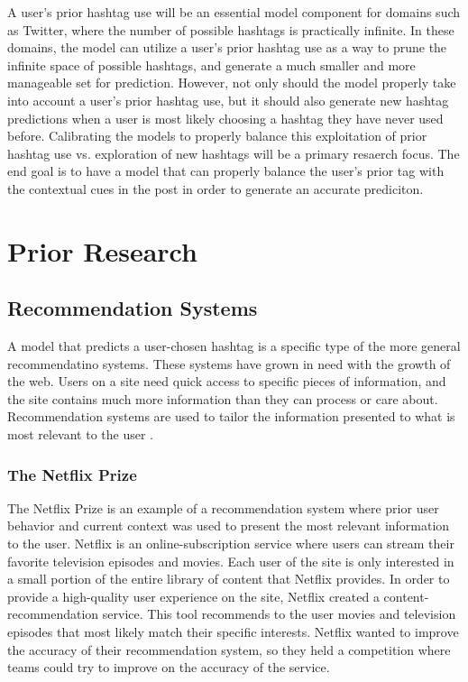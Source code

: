 \documentclass[man,floatsintext]{apa6}
\begin{document}
A user's prior hashtag use will be an essential model component for domains such as Twitter, where the number of possible hashtags is practically infinite.
In these domains, the model can utilize a user's prior hashtag use as a way to prune the infinite space of possible hashtags, and generate a much smaller and more manageable set for prediction.
However, not only should the model properly take into account a user's prior hashtag use, but it should also generate new hashtag predictions when a user is most likely choosing a hashtag they have never used before.
Calibrating the models to properly balance this exploitation of prior hashtag use vs. exploration of new hashtags will be a primary resaerch focus.
The end goal is to have a model that can properly balance the user's prior tag with the contextual cues in the post in order to generate an accurate prediciton.

\section{Prior Research}

\subsection{Recommendation Systems}

A model that predicts a user-chosen hashtag is a specific type of the more general recommendatino systems.
These systems have grown in need with the growth of the web.
Users on a site need quick access to specific pieces of information, and the site contains much more information than they can process or care about.
Recommendation systems are used to tailor the information presented to what is most relevant to the user \parencite{Pazzani2007}.

\subsubsection{The Netflix Prize}

The Netflix Prize \parencite{Bennett2007} is an example of a recommendation system where prior user behavior and current context was used to present the most relevant information to the user.
Netflix is an online-subscription service where users can stream their favorite television episodes and movies.
Each user of the site is only interested in a small portion of the entire library of content that Netflix provides.
In order to provide a high-quality user experience on the site, Netflix created a content-recommendation service.
This tool recommends to the user movies and television episodes that most likely match their specific interests.
Netflix wanted to improve the accuracy of their recommendation system, so they held a competition where teams could try to improve on the accuracy of the service.
\end{document}
